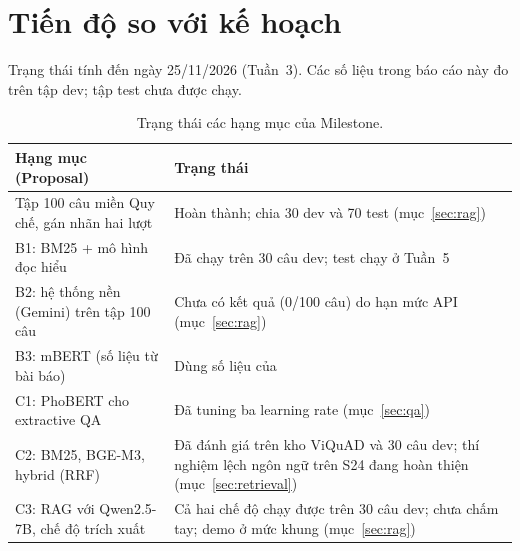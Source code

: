 \section{Tiến độ so với kế hoạch}
\label{sec:progress}

Trạng thái tính đến ngày 25/11/2026 (Tuần~3). Các số liệu trong báo cáo này đo trên tập dev; tập test chưa được chạy.

\begin{table}[h]
\centering\small
\begin{tabular}{@{}>{\raggedright\arraybackslash}p{}>{\raggedright\arraybackslash}p{}@{}}
\toprule
\textbf{Hạng mục (Proposal)} & \textbf{Trạng thái} \\
\midrule
Tập 100 câu miền Quy chế, gán nhãn hai lượt & Hoàn thành; chia 30 dev và 70 test (mục~\ref{sec:rag}) \\
B1: BM25 + mô hình đọc hiểu & Đã chạy trên 30 câu dev; test chạy ở Tuần~5 \\
B2: hệ thống nền (Gemini) trên tập 100 câu & Chưa có kết quả (0/100 câu) do hạn mức API (mục~\ref{sec:rag}) \\
B3: mBERT (số liệu từ bài báo) & Dùng số liệu của \citet{nguyen2022vimrc} \\
C1: PhoBERT cho extractive QA & Đã tuning ba learning rate (mục~\ref{sec:qa}) \\
C2: BM25, BGE-M3, hybrid (RRF) & Đã đánh giá trên kho ViQuAD và 30 câu dev; thí nghiệm lệch ngôn ngữ trên S24 đang hoàn thiện (mục~\ref{sec:retrieval}) \\
C3: RAG với Qwen2.5-7B, chế độ trích xuất & Cả hai chế độ chạy được trên 30 câu dev; chưa chấm tay; demo ở mức khung (mục~\ref{sec:rag}) \\
\bottomrule
\end{tabular}
\caption{Trạng thái các hạng mục của Milestone.}
\label{tab:status}
\end{table}
